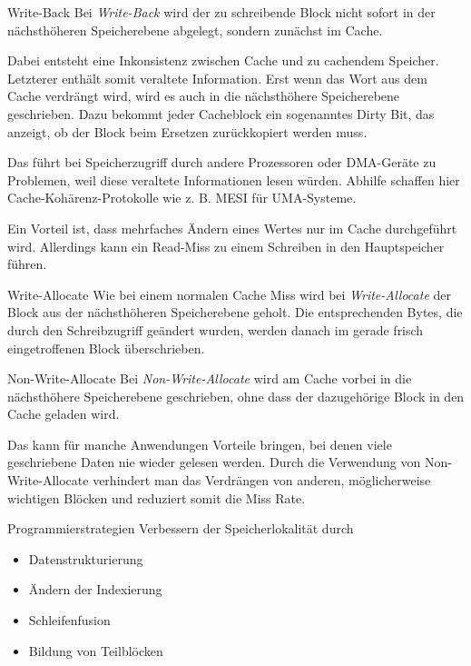 \begin{defi}[Schreibstrategie]{Write-Back}
    Bei \emph{Write-Back} wird der zu schreibende Block nicht sofort in der nächsthöheren Speicherebene abgelegt, sondern zunächst im Cache.
    
    Dabei entsteht eine Inkonsistenz zwischen Cache und zu cachendem Speicher.
    Letzterer enthält somit veraltete Information.
    Erst wenn das Wort aus dem Cache verdrängt wird, wird es auch in die nächsthöhere Speicherebene geschrieben.
    Dazu bekommt jeder Cacheblock ein sogenanntes Dirty Bit, das anzeigt, ob der Block beim Ersetzen zurückkopiert werden muss.
    
    Das führt bei Speicherzugriff durch andere Prozessoren oder DMA-Geräte zu Problemen, weil diese veraltete Informationen lesen würden.
    Abhilfe schaffen hier Cache-Kohärenz-Protokolle wie z. B. MESI für UMA-Systeme.
    
    Ein Vorteil ist, dass mehrfaches Ändern eines Wertes nur im Cache durchgeführt wird.
    Allerdings kann ein Read-Miss zu einem Schreiben in den Hauptspeicher führen.
\end{defi}

\begin{bonus}[Schreibstrategie]{Write-Allocate}
    Wie bei einem normalen Cache Miss wird bei \emph{Write-Allocate} der Block aus der nächsthöheren Speicherebene geholt.
    Die entsprechenden Bytes, die durch den Schreibzugriff geändert wurden, werden danach im gerade frisch eingetroffenen Block überschrieben.
\end{bonus}

\begin{bonus}[Schreibstrategie]{Non-Write-Allocate}
    Bei \emph{Non-Write-Allocate} wird am Cache vorbei in die nächsthöhere Speicherebene geschrieben, ohne dass der dazugehörige Block in den Cache geladen wird.
    
    Das kann für manche Anwendungen Vorteile bringen, bei denen viele geschriebene Daten nie wieder gelesen werden.
    Durch die Verwendung von Non-Write-Allocate verhindert man das Verdrängen von anderen, möglicherweise wichtigen Blöcken und reduziert somit die Miss Rate.
\end{bonus}

\begin{defi}{Programmierstrategien}
    Verbessern der Speicherlokalität durch
    \begin{itemize}[\ldots]
        \item Datenstrukturierung
        \item Ändern der Indexierung
        \item Schleifenfusion
        \item Bildung von Teilblöcken
    \end{itemize}
\end{defi}

